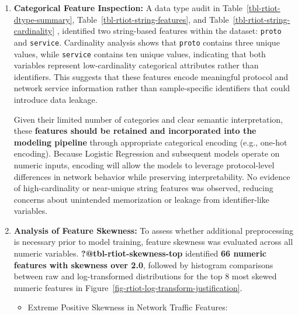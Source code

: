 \documentclass[
  letterpaper,
  DIV=11,
  numbers=noendperiod]{scrartcl}
\begin{document}
\begin{enumerate}
  To maintain methodological rigor while avoiding synthetic data
  generation, we construct a balanced dataset through \textbf{random
  downsampling of the majority attack class}. All available normal
  traffic samples are retained, and an equal number of attack flows are
  selected without replacement. This approach preserves authentic
  network behavior while mitigating class imbalance for subsequent model
  training and evaluation.
\item
  \textbf{Categorical Feature Inspection:} A data type audit in
  Table~\ref{tbl-rtiot-dtype-summary},
  Table~\ref{tbl-rtiot-string-features}, and
  Table~\ref{tbl-rtiot-string-cardinality} , identified two string-based
  features within the dataset: \texttt{proto} and \texttt{service}.
  Cardinality analysis shows that \texttt{proto} contains three unique
  values, while \texttt{service} contains ten unique values, indicating
  that both variables represent low-cardinality categorical attributes
  rather than identifiers. This suggests that these features encode
  meaningful protocol and network service information rather than
  sample-specific identifiers that could introduce data leakage.

  Given their limited number of categories and clear semantic
  interpretation, these \textbf{features should be retained and
  incorporated into the modeling pipeline} through appropriate
  categorical encoding (e.g., one-hot encoding). Because Logistic
  Regression and subsequent models operate on numeric inputs, encoding
  will allow the models to leverage protocol-level differences in
  network behavior while preserving interpretability. No evidence of
  high-cardinality or near-unique string features was observed, reducing
  concerns about unintended memorization or leakage from identifier-like
  variables.
\item
  \textbf{Analysis of Feature Skewness:} To assess whether additional
  preprocessing is necessary prior to model training, feature skewness
  was evaluated across all numeric variables.
  \textbf{?@tbl-rtiot-skewness-top} identified \textbf{66 numeric
  features with skewness over 2.0}, followed by histogram comparisons
  between raw and log-transformed distributions for the top 8 most
  skewed numeric features in
  Figure~\ref{fig-rtiot-log-transform-justification}.

  \begin{itemize}
  \item
    Extreme Positive Skewness in Network Traffic Features:


\end{itemize}
\end{enumerate}
\end{document}
